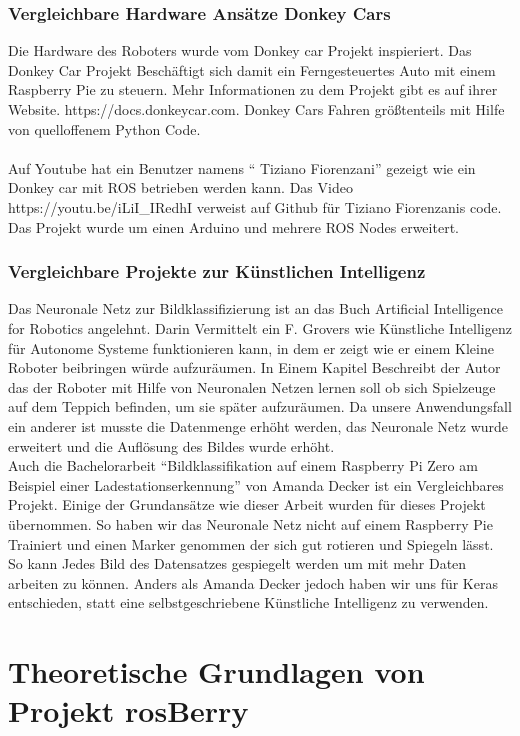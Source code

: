 \documentclass[conference]{IEEEtran}
\begin{document}
\subsubsection{Vergleichbare Hardware Ansätze Donkey Cars} %
Die Hardware des Roboters wurde vom Donkey car Projekt inspieriert. Das Donkey Car Projekt Beschäftigt sich damit ein Ferngesteuertes Auto mit einem Raspberry Pie zu steuern. Mehr Informationen zu dem Projekt gibt es auf ihrer Website. https://docs.donkeycar.com.  Donkey Cars Fahren größtenteils mit Hilfe von quelloffenem Python Code. \\
\\
Auf Youtube hat ein Benutzer namens "` Tiziano Fiorenzani"' gezeigt wie ein Donkey car mit ROS betrieben werden kann. Das Video https://youtu.be/iLiI\_IRedhI verweist auf Github für Tiziano Fiorenzanis code. Das Projekt wurde um einen Arduino und mehrere ROS Nodes erweitert.
\subsubsection{Vergleichbare Projekte zur Künstlichen Intelligenz} %

 Das Neuronale Netz zur Bildklassifizierung ist an das Buch  Artificial Intelligence for Robotics  \cite{b1} angelehnt. Darin Vermittelt ein F. Grovers wie Künstliche Intelligenz für Autonome Systeme  funktionieren kann, in dem er zeigt wie er einem Kleine Roboter beibringen würde aufzuräumen. In Einem Kapitel Beschreibt der Autor das der Roboter mit Hilfe von Neuronalen Netzen lernen soll ob sich Spielzeuge auf dem Teppich befinden, um sie später aufzuräumen.  Da unsere Anwendungsfall ein anderer ist  musste die Datenmenge erhöht werden, das Neuronale Netz wurde erweitert und die Auflösung des Bildes wurde erhöht.\\

Auch die Bachelorarbeit  "`Bildklassifikation auf einem Raspberry Pi Zero
am Beispiel einer Ladestationserkennung"'  von Amanda Decker ist ein Vergleichbares Projekt.  Einige der Grundansätze wie  dieser Arbeit wurden für dieses Projekt übernommen. So haben wir das Neuronale Netz nicht auf einem Raspberry Pie Trainiert und einen Marker genommen der sich gut rotieren und Spiegeln lässt. So kann Jedes Bild des Datensatzes gespiegelt werden um mit mehr Daten arbeiten zu können. Anders als Amanda Decker jedoch haben wir uns für Keras entschieden, statt eine selbstgeschriebene Künstliche Intelligenz zu verwenden. 
\section{Theoretische Grundlagen von Projekt rosBerry}
\end{document}
